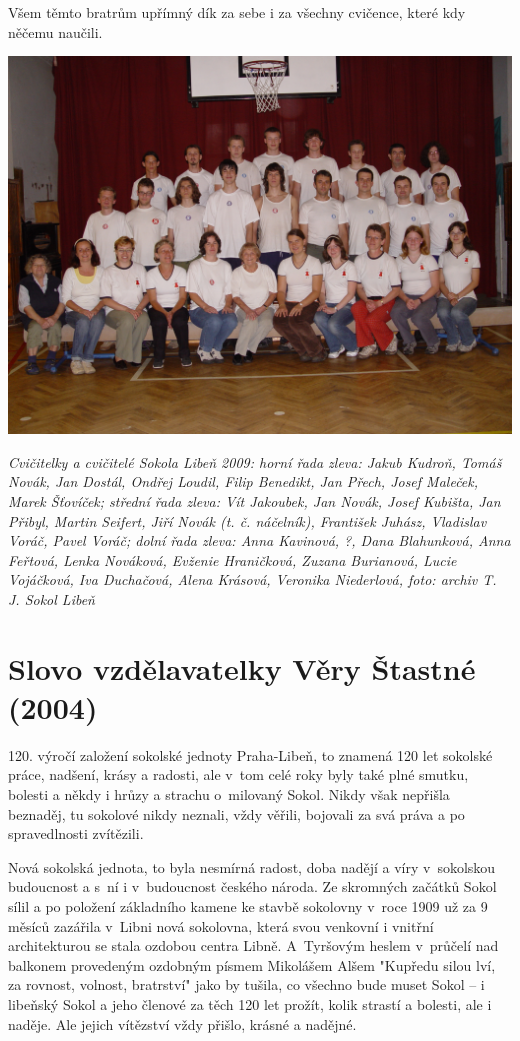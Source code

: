 \documentclass[a5paper, 11pt, twoside]{article}
\begin{document}
Všem těmto bratrům upřímný dík za sebe i za všechny cvičence, které kdy
něčemu naučili.

 \includegraphics[width=\textwidth]{img/48_cvicitele.JPG}

\textit{Cvičitelky a cvičitelé Sokola Libeň 2009: horní řada zleva: Jakub
Kudroň, Tomáš Novák, Jan Dostál, Ondřej Loudil, Filip Benedikt, Jan
Přech, Josef Maleček, Marek Šťovíček; střední řada zleva: Vít Jakoubek,
Jan Novák, Josef Kubišta, Jan Přibyl, Martin Seifert, Jiří Novák (t. č.
náčelník), František Juhász, Vladislav Voráč, Pavel Voráč; dolní řada
zleva: Anna Kavinová, ?, Dana Blahunková, Anna Feřtová, Lenka Nováková,
Evženie Hraničková, Zuzana Burianová, Lucie Vojáčková, Iva Duchačová,
Alena Krásová, Veronika Niederlová, foto: archiv T. J. Sokol Libeň}

\section{Slovo vzdělavatelky Věry Štastné
(2004)}

120. výročí založení sokolské jednoty Praha-Libeň, to znamená 120 let
sokolské práce, nadšení, krásy a radosti, ale v~tom celé roky byly také
plné smutku, bolesti a někdy i hrůzy a strachu o~milovaný Sokol. Nikdy
však nepřišla beznaděj, tu sokolové nikdy neznali, vždy věřili, bojovali
za svá práva a po spravedlnosti zvítězili.

Nová sokolská jednota, to byla nesmírná radost, doba nadějí a víry
v~sokolskou budoucnost a s~ní i v~budoucnost českého národa. Ze skromných
začátků Sokol sílil a po položení základního kamene ke stavbě sokolovny
v~roce 1909 už za 9 měsíců zazářila v~Libni nová sokolovna, která svou
venkovní i vnitřní architekturou se stala ozdobou centra Libně.
A~Tyršovým heslem v~průčelí nad balkonem provedeným ozdobným písmem
Mikolášem Alšem "Kupředu silou lví, za rovnost, volnost, bratrství"
jako by tušila, co všechno bude muset Sokol --⁠⁠⁠⁠⁠⁠ i libeňský Sokol a jeho
členové za těch 120 let prožít, kolik strastí a bolesti, ale i naděje.
Ale jejich vítězství vždy přišlo, krásné a nadějné.
\end{document}
